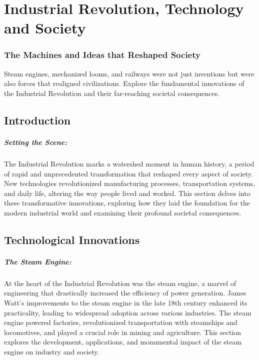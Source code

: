 \documentclass[a4paper,12pt]{book}
\begin{document}
\chapter{Industrial Revolution, Technology and Society}
\subsection*{The Machines and Ideas that Reshaped Society}
Steam engines, mechanized looms, and railways were not just inventions but were also forces that realigned civilizations. Explore the fundamental innovations of the Industrial Revolution and their far-reaching societal consequences.

\section*{Introduction}

\paragraph{Setting the Scene:}
The Industrial Revolution marks a watershed moment in human history, a period of rapid and unprecedented transformation that reshaped every aspect of society. New technologies revolutionized manufacturing processes, transportation systems, and daily life, altering the way people lived and worked. This section delves into these transformative innovations, exploring how they laid the foundation for the modern industrial world and examining their profound societal consequences.

\section*{Technological Innovations}

\paragraph{The Steam Engine:}
At the heart of the Industrial Revolution was the steam engine, a marvel of engineering that drastically increased the efficiency of power generation. James Watt's improvements to the steam engine in the late 18th century enhanced its practicality, leading to widespread adoption across various industries. The steam engine powered factories, revolutionized transportation with steamships and locomotives, and played a crucial role in mining and agriculture. This section explores the development, applications, and monumental impact of the steam engine on industry and society.
\end{document}
